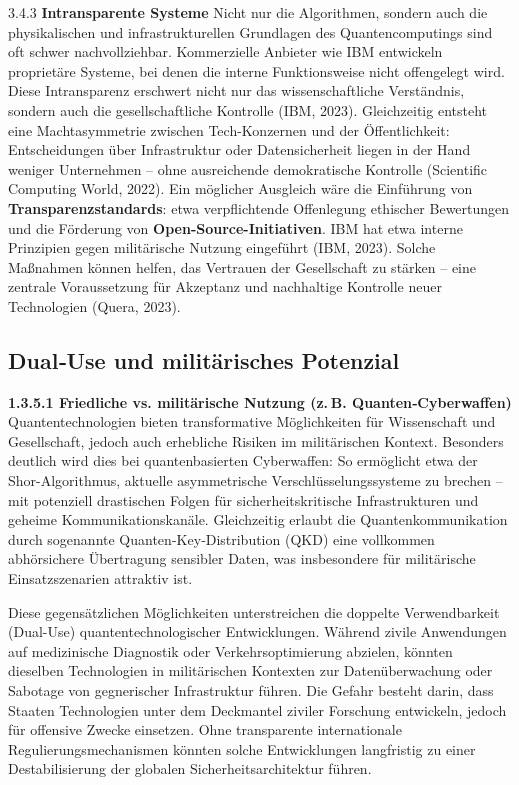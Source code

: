 {3.4.3 \textbf{Intransparente Systeme }
Nicht nur die Algorithmen, sondern auch die physikalischen und infrastrukturellen Grundlagen des Quantencomputings sind oft schwer nachvollziehbar. Kommerzielle Anbieter wie IBM entwickeln proprietäre Systeme, bei denen die interne Funktionsweise nicht offengelegt wird. Diese Intransparenz erschwert nicht nur das wissenschaftliche Verständnis, sondern auch die gesellschaftliche Kontrolle (IBM, 2023)\cite{noauthor_defining_nodate}.
Gleichzeitig entsteht eine Machtasymmetrie zwischen Tech-Konzernen und der Öffentlichkeit: Entscheidungen über Infrastruktur oder Datensicherheit liegen in der Hand weniger Unternehmen – ohne ausreichende demokratische Kontrolle (Scientific Computing World, 2022)\cite{noauthor_ethics_nodate}.
Ein möglicher Ausgleich wäre die Einführung von \textbf{Transparenzstandards}: etwa verpflichtende Offenlegung ethischer Bewertungen und die Förderung von \textbf{Open-Source-Initiativen}. IBM hat etwa interne Prinzipien gegen militärische Nutzung eingeführt (IBM, 2023)\cite{noauthor_defining_nodate}. Solche Maßnahmen können helfen, das Vertrauen der Gesellschaft zu stärken – eine zentrale Voraussetzung für Akzeptanz und nachhaltige Kontrolle neuer Technologien (Quera, 2023)\cite{noauthor_quantum_nodate}.
 
\subsection{Dual‑Use und militärisches Potenzial}
\textbf{1.3.5.1 \textbf{Friedliche vs. militärische Nutzung (z. B. Quanten‑Cyberwaffen)} }
Quantentechnologien bieten transformative Möglichkeiten für Wissenschaft und Gesellschaft, jedoch auch erhebliche Risiken im militärischen Kontext. Besonders deutlich wird dies bei quantenbasierten Cyberwaffen: So ermöglicht etwa der Shor-Algorithmus, aktuelle asymmetrische Verschlüsselungssysteme zu brechen – mit potenziell drastischen Folgen für sicherheitskritische Infrastrukturen und geheime Kommunikationskanäle\cite{krelina_quantum_2021}. Gleichzeitig erlaubt die Quantenkommunikation durch sogenannte Quanten‑Key‑Distribution (QKD) eine vollkommen abhörsichere Übertragung sensibler Daten, was insbesondere für militärische Einsatzszenarien attraktiv ist\cite{neumann_quantum_2020}.

Diese gegensätzlichen Möglichkeiten unterstreichen die doppelte Verwendbarkeit (Dual-Use) quantentechnologischer Entwicklungen. Während zivile Anwendungen auf medizinische Diagnostik oder Verkehrsoptimierung abzielen, könnten dieselben Technologien in militärischen Kontexten zur Datenüberwachung oder Sabotage von gegnerischer Infrastruktur führen. Die Gefahr besteht darin, dass Staaten Technologien unter dem Deckmantel ziviler Forschung entwickeln, jedoch für offensive Zwecke einsetzen. Ohne transparente internationale Regulierungsmechanismen könnten solche Entwicklungen langfristig zu einer Destabilisierung der globalen Sicherheitsarchitektur führen.

}
